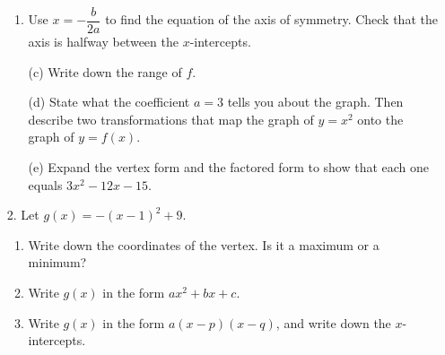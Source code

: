 \documentclass[12pt, twoside]{article}
\begin{document}
\begin{enumerate}[itemsep=0.15cm]
\begin{enumerate}[itemsep=0.1cm]
  \item Use $x = -\dfrac{b}{2a}$ to find the equation of the axis of
  symmetry. Check that the axis is halfway between the $x$-intercepts.
  \vfill
\end{enumerate}

\newpage

\begin{enumerate}[itemsep=0.1cm]
  \item[(c)] Write down the range of $f$. \vfill
  \item[(d)] State what the coefficient $a = 3$ tells you about the graph.
  Then describe two transformations that map the graph of $y = x^{2}$ onto
  the graph of $y = f(x)$. \vfill
  \item[(e)] Expand the vertex form and the factored form to show that each
  one equals $3x^{2} - 12x - 15$. \vfill \vfill
\end{enumerate}

\newpage

\item[2.]
Let $g(x) = -(x - 1)^{2} + 9$.

\begin{enumerate}[itemsep=0.1cm]
  \item Write down the coordinates of the vertex. Is it a maximum or a
  minimum? \vfill
  \item Write $g(x)$ in the form $ax^{2} + bx + c$. \vfill \vfill
  \item Write $g(x)$ in the form $a(x - p)(x - q)$, and write down the
  $x$-intercepts. \vfill \vfill
\end{enumerate}


\end{enumerate}
\end{document}
